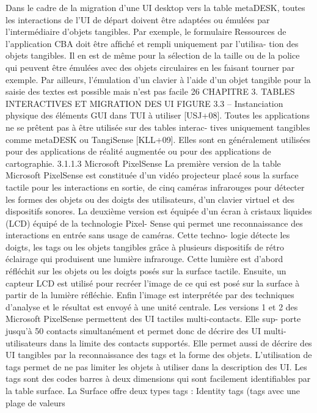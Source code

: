 \documentclass{article}
\begin{document}
Dans le cadre de la migration d’une UI desktop vers la table metaDESK, toutes les interactions de
l’UI de départ doivent être adaptées ou émulées par l’intermédiaire d’objets tangibles. Par exemple,
le formulaire Ressources de l’application CBA doit être afﬁché et rempli uniquement par l’utilisa-
tion des objets tangibles. Il en est de même pour la sélection de la taille ou de la police qui peuvent
être émulées avec des objets circulaires en les faisant tourner par exemple. Par ailleurs, l’émulation
d’un clavier à l’aide d’un objet tangible pour la saisie des textes est possible mais n’est pas facile
26
CHAPITRE 3. TABLES INTERACTIVES ET MIGRATION DES UI
FIGURE 3.3 – Instanciation physique des éléments GUI dans TUI
à utiliser [USJ+08]. Toutes les applications ne se prêtent pas à être utilisée sur des tables interac-
tives uniquement tangibles comme metaDESK ou TangiSense [KLL+09]. Elles sont en généralement
utilisées pour des applications de réalité augmentée ou pour des applications de cartographie.
3.1.1.3
Microsoft PixelSense
La première version de la table Microsoft PixelSense est constituée d’un vidéo projecteur placé
sous la surface tactile pour les interactions en sortie, de cinq caméras infrarouges pour détecter les
formes des objets ou des doigts des utilisateurs, d’un clavier virtuel et des dispositifs sonores. La
deuxième version est équipée d’un écran à cristaux liquides (LCD) équipé de la technologie Pixel-
Sense qui permet une reconnaissance des interactions en entrée sans usage de caméras. Cette techno-
logie détecte les doigts, les tags ou les objets tangibles grâce à plusieurs dispositifs de rétro éclairage
qui produisent une lumière infrarouge. Cette lumière est d’abord réﬂéchit sur les objets ou les doigts
posés sur la surface tactile. Ensuite, un capteur LCD est utilisé pour recréer l’image de ce qui est
posé sur la surface à partir de la lumière réﬂéchie. Enﬁn l’image est interprétée par des techniques
d’analyse et le résultat est envoyé à une unité centrale.
Les versions 1 et 2 des Microsoft PixelSense permettent des UI tactiles multi-contacts. Elle sup-
porte jusqu’à 50 contacts simultanément et permet donc de décrire des UI multi-utilisateurs dans la
limite des contacts supportés. Elle permet aussi de décrire des UI tangibles par la reconnaissance des
tags et la forme des objets. L’utilisation de tags permet de ne pas limiter les objets à utiliser dans la
description des UI. Les tags sont des codes barres à deux dimensions qui sont facilement identiﬁables
par la table surface. La Surface offre deux types tags : Identity tags (tags avec une plage de valeurs
\end{document}
